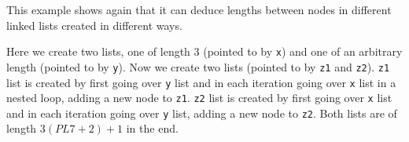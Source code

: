 This example shows again that it can deduce lengths between nodes in different linked lists created in different ways.

Here we create two lists, one of length 3 (pointed to by \texttt{x}) and one of an arbitrary length (pointed to by \texttt{y}). Now we create two lists (pointed to by \texttt{z1} and \texttt{z2}). \texttt{z1} list is created by first going over \texttt{y} list and in each iteration going over \texttt{x} list in a nested loop, adding a new node to \texttt{z1}. \texttt{z2} list is created by first going over \texttt{x} list and in each iteration going over \texttt{y} list, adding a new node to \texttt{z2}. Both lists are of length $3(PL7 + 2) + 1$ in the end. 
